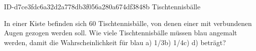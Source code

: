 \begin{exercise}
      {ID-d7ce3fdc6a32d2a778db3f056a280a674df3848b}
      {Tischtennisbälle}
  \ifproblem\problem\par
    In einer Kiste befinden sich 60 Tischtennisbälle, von denen einer mit
    verbundenen Augen gezogen werden soll. Wie viele Tischtennisbälle müssen
    blau angemalt werden, damit die Wahrscheinlichkeit für \glqq blau\grqq{}
    \quad a) 1/3\quad b) 1/4\quad c) \quad d) \quad beträgt?
  \fi
\end{exercise}
